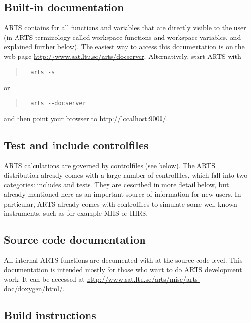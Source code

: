 \subsection{Built-in documentation}
\label{sec:built-in_doc}

ARTS contains  for all functions and
variables that are directly visible to the user (in ARTS terminology
called workspace functions and workspace variables, and explained
further below).  The easiest way to access this documentation is on
the web page
\url{http://www.sat.ltu.se/arts/docserver}. Alternatively, start ARTS
with
\begin{quote}
\begin{verbatim}
  arts -s
\end{verbatim}
\end{quote}
or
\begin{quote}
\begin{verbatim}
  arts --docserver
\end{verbatim}
\end{quote}
and then point your browser to \url{http://localhost:9000/}.

\subsection{Test and include controlfiles}

ARTS calculations are governed by controlfiles (see below).  The ARTS
distribution already comes with a large number of controlfiles, which
fall into two categories: includes and tests.  They are described in
more detail below, but already mentioned here as an important source
of information for new users.  In particular, ARTS already comes with
controlfiles to simulate some well-known instruments, such as for
example MHS or HIRS.

\subsection{Source code documentation}

All internal ARTS functions are documented with  at the source
code level.  This documentation is intended mostly for those who want
to do ARTS development work.  It can be accessed at
\url{http://www.sat.ltu.se/arts/misc/arts-doc/doxygen/html/}. 

\subsection{Build instructions}

